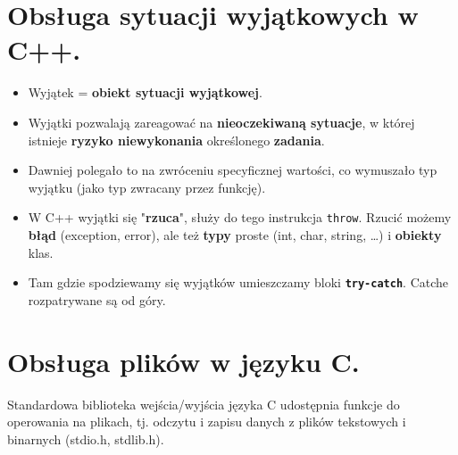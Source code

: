 \documentclass[main.tex]{subfiles}
\begin{document}
    \section{Obsługa sytuacji wyjątkowych w C++.}
    \begin{itemize}
        \item Wyjątek = \textbf{obiekt sytuacji wyjątkowej}.
        \item Wyjątki pozwalają zareagować na \textbf{nieoczekiwaną sytuacje}, w której istnieje \textbf{ryzyko
        niewykonania} określonego \textbf{zadania}.
        \item Dawniej polegało to na zwróceniu specyficznej wartości, co wymuszało typ wyjątku (jako typ zwracany przez funkcję).
        \item W C++ wyjątki się "\textbf{rzuca}", służy do tego instrukcja \texttt{throw}. Rzucić możemy \textbf{błąd}
        (exception, error), ale też \textbf{typy} proste (int, char, string, \ldots) i \textbf{obiekty} klas.
        \item Tam gdzie spodziewamy się wyjątków umieszczamy bloki \textbf{\texttt{try-catch}}. Catche rozpatrywane są
        od góry.
    \end{itemize}


    \section{Obsługa plików w języku C.}

    Standardowa biblioteka wejścia/wyjścia języka C udostępnia funkcje do operowania na plikach, tj.
    odczytu i zapisu danych z plików tekstowych i binarnych (stdio.h, stdlib.h).
\end{document}
